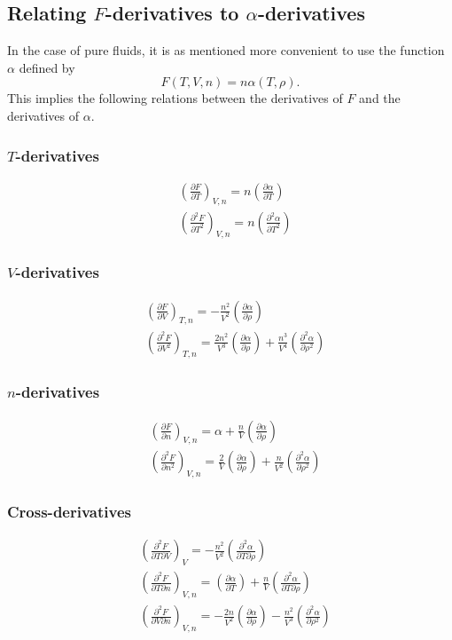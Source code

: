 \documentclass[english]{../thermomemo/thermomemo}
\newcommand*{\pder}[2]{\left(\frac{\partial #1}{\partial #2}\right)}
\newcommand*{\pdder}[2]{\left(\frac{\partial^2 #1}{\partial #2^2}\right)}
\newcommand*{\pdcross}[3]{\left(\frac{\partial^2 #1}{\partial #2 \partial #3}\right)}
\numberwithin{equation}{section}
\begin{document}
\subsection{Relating $F$-derivatives to $\alpha$-derivatives}
In the case of pure fluids, it is as mentioned more convenient to use
the function $\alpha$ defined by
\begin{equation}
  F(T,V,n) = n \alpha(T, \rho).
\end{equation}
This implies the following relations between the derivatives of $F$
and the derivatives of $\alpha$.

\subsubsection*{$T$-derivatives}
\begin{align}
  \label{eq:DFDT}
  & \pder{F}{T}_{V, n} = n \pder{\alpha}{T} \\
  \label{eq:D2FDT2}
  & \pdder{F}{T}_{V, n} = n \pdder{\alpha}{T}
\end{align}

\subsubsection*{$V$-derivatives}
\begin{align}
  \label{eq:DFDV}
  & \pder{F}{V}_{T, n} = -\frac{n^2}{V^2} \pder{\alpha}{\rho} \\
  \label{eq:D2FDV2}
  & \pdder{F}{V}_{T, n} = \frac{2n^2}{V^3} \pder{\alpha}{\rho} +
  \frac{n^3}{V^4} \pdder{\alpha}{\rho}
\end{align}

\subsubsection*{$n$-derivatives}
\begin{align}
  \label{eq:DFDn}
  & \pder{F}{n}_{V, n} = \alpha + \frac{n}{V}\pder{\alpha}{\rho} \\
  \label{eq:D2FDn2}
  & \pdder{F}{n}_{V, n} = \frac{2}{V} \pder{\alpha}{\rho} +
  \frac{n}{V^2} \pdder{\alpha}{\rho}
\end{align}

\subsubsection*{Cross-derivatives}
\begin{align}
  \label{eq:D2FDTV}
  & \pdcross{F}{T}{V}_{V} = -\frac{n^2}{V^2} \pdcross{\alpha}{T}{\rho} \\
  \label{eq:D2FDTn}
  & \pdcross{F}{T}{n}_{V, n} = \pder{\alpha}{T} + \frac{n}{V} \pdcross{\alpha}{T}{\rho} \\
  \label{eq:D2FDVn}
  & \pdcross{F}{V}{n}_{V, n} = -\frac{2n}{V^2} \pder{\alpha}{\rho} -
  \frac{n^2}{V^3} \pdder{\alpha}{\rho}
\end{align}
\end{document}
